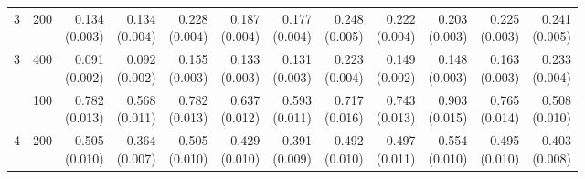 \begin{table}[p]
{\begin{tabular}{llrrrrrrrrrr}
3 & 200 & \shortstack{0.134\\(0.003)} & \shortstack{0.134\\(0.004)} & \shortstack{0.228\\(0.004)} & \shortstack{0.187\\(0.004)} & \shortstack{0.177\\(0.004)} & \shortstack{0.248\\(0.005)} & \shortstack{0.222\\(0.004)} & \shortstack{0.203\\(0.003)} & \shortstack{0.225\\(0.003)} & \shortstack{0.241\\(0.005)} \\
3 & 400 & \shortstack{0.091\\(0.002)} & \shortstack{0.092\\(0.002)} & \shortstack{0.155\\(0.003)} & \shortstack{0.133\\(0.003)} & \shortstack{0.131\\(0.003)} & \shortstack{0.223\\(0.004)} & \shortstack{0.149\\(0.002)} & \shortstack{0.148\\(0.003)} & \shortstack{0.163\\(0.003)} & \shortstack{0.233\\(0.004)} \\
\addlinespace
4 & 100 & \shortstack{0.782\\(0.013)} & \shortstack{0.568\\(0.011)} & \shortstack{0.782\\(0.013)} & \shortstack{0.637\\(0.012)} & \shortstack{0.593\\(0.011)} & \shortstack{0.717\\(0.016)} & \shortstack{0.743\\(0.013)} & \shortstack{0.903\\(0.015)} & \shortstack{0.765\\(0.014)} & \shortstack{0.508\\(0.010)} \\
4 & 200 & \shortstack{0.505\\(0.010)} & \shortstack{0.364\\(0.007)} & \shortstack{0.505\\(0.010)} & \shortstack{0.429\\(0.010)} & \shortstack{0.391\\(0.009)} & \shortstack{0.492\\(0.010)} & \shortstack{0.497\\(0.011)} & \shortstack{0.554\\(0.010)} & \shortstack{0.495\\(0.010)} & \shortstack{0.403\\(0.008)} \\

\end{tabular}}
\end{table}
